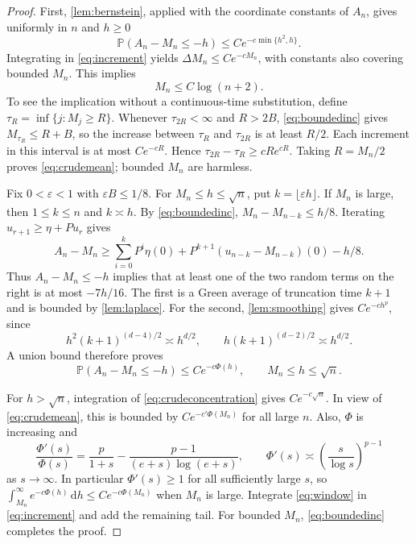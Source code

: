 \documentclass[11pt]{amsart}
\theoremstyle{remark}
\newcommand{\Pp}{\mathbb P}
\newcommand{\dd}{\,\mathrm d}
\begin{document}
\begin{proof}
First, \cref{lem:bernstein}, applied with the coordinate constants of
$A_n$, gives uniformly in $n$ and $h\ge0$
\begin{equation}\label{eq:crudeconcentration}
 \Pp(A_n-M_n\le-h)\le C e^{-c\min\{h^2,h\}}.
\end{equation}
Integrating in \eqref{eq:increment} yields
$\Delta M_n\le Ce^{-cM_n}$, with constants also covering bounded $M_n$.
This implies
\begin{equation}\label{eq:crudemean}
 M_n\le C\log(n+2).
\end{equation}
To see the implication without a continuous-time substitution, define
$\tau_R=\inf\{j:M_j\ge R\}$. Whenever $\tau_{2R}<\infty$ and $R>2B$,
\eqref{eq:boundedinc} gives $M_{\tau_R}\le R+B$, so the increase between
$\tau_R$ and $\tau_{2R}$ is at least $R/2$. Each increment in this
interval is at most $Ce^{-cR}$. Hence
$\tau_{2R}-\tau_R\ge cRe^{cR}$. Taking $R=M_n/2$ proves
\eqref{eq:crudemean}; bounded $M_n$ are harmless.

Fix $0<\varepsilon<1$ with $\varepsilon B\le1/8$. For
$M_n\le h\le\sqrt n$, put $k=\lfloor\varepsilon h\rfloor$.
If $M_n$ is large, then $1\le k\le n$ and $k\asymp h$.
By \eqref{eq:boundedinc}, $M_n-M_{n-k}\le h/8$.
Iterating $u_{r+1}\ge\eta+Pu_r$ gives
\begin{equation}\label{eq:decomposition}
 A_n-M_n\ge\sum_{i=0}^kP^i\eta(0)
 +P^{k+1}(u_{n-k}-M_{n-k})(0)-h/8.
\end{equation}
Thus $A_n-M_n\le-h$ implies that at least one of the two random terms
on the right is at most $-7h/16$. The first is a Green average of
truncation time $k+1$ and is bounded by \cref{lem:laplace}.
For the second, \cref{lem:smoothing} gives $Ce^{-ch^p}$, since
\[
 h^2(k+1)^{(d-4)/2}\asymp h^{d/2},\qquad
 h(k+1)^{(d-2)/2}\asymp h^{d/2}.
\]
A union bound therefore proves
\begin{equation}\label{eq:window}
 \Pp(A_n-M_n\le-h)\le Ce^{-c\Phi(h)},
 \qquad M_n\le h\le\sqrt n.
\end{equation}

For $h>\sqrt n$, integration of \eqref{eq:crudeconcentration} gives
$Ce^{-c\sqrt n}$. In view of \eqref{eq:crudemean}, this is bounded by
$Ce^{-c'\Phi(M_n)}$ for all large $n$. Also, $\Phi$ is increasing and
\begin{equation}\label{eq:phiderivative}
 \frac{\Phi'(s)}{\Phi(s)}
 =\frac p{1+s}-\frac{p-1}{(e+s)\log(e+s)},\qquad
 \Phi'(s)\asymp\left(\frac{s}{\log s}\right)^{p-1}
\end{equation}
as $s\to\infty$. In particular $\Phi'(s)\ge1$ for all sufficiently
large $s$, so
$\int_{M_n}^\infty e^{-c\Phi(h)}\dd h\le C e^{-c\Phi(M_n)}$
when $M_n$ is large. Integrate \eqref{eq:window} in
\eqref{eq:increment} and add the remaining tail. For bounded $M_n$,
\eqref{eq:boundedinc} completes the proof.
\end{proof}
\end{document}
